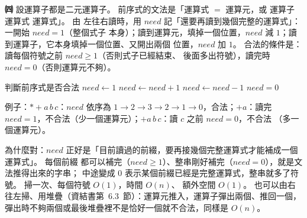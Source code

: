 \begin{pastsoln}
\textbf{㈣} 設運算子都是二元運算子。 前序式的文法是「運算式 $=$ 運算元，或 運算子 運算式 運算式」。 由
左往右讀時，用 $\mathit{need}$ 記「還要再讀到幾個完整的運算式」：一開始 $\mathit{need} = 1$（整個式子
本身）；讀到運算元，填掉一個位置，$\mathit{need}$ 減 $1$；讀到運算子，它本身填掉一個位置、又開出兩個
位置，$\mathit{need}$ 加 $1$。 合法的條件是：讀每個符號之前 $\mathit{need} \ge 1$（否則式子已經結束、
後面多出符號），讀完時 $\mathit{need} = 0$（否則運算元不夠）。
\begin{pseudo}[unbreakable]{判斷前序式是否合法}
 
    \State $\mathit{need} \gets 1$
            \State \Return \FALSE {}
        \EndIf
            \State $\mathit{need} \gets \mathit{need} + 1$
        \Else
            \State $\mathit{need} \gets \mathit{need} - 1$
        \EndIf
    \EndFor
    \State \Return $\mathit{need} = 0$
\EndFunction
\end{pseudo}
例子：$* + a\, b\, c$：$\mathit{need}$ 依序為 $1 \to 2 \to 3 \to 2 \to 1 \to 0$，合法；$+ a$：讀完
$\mathit{need} = 1$，不合法（少一個運算元）；$+ a\, b\, c$：讀 $c$ 之前 $\mathit{need} = 0$，不合法
（多一個運算元）。

為什麼對：$\mathit{need}$ 正好是「目前讀過的前綴，要再接幾個完整運算式才能補成一個運算式」。 每個前綴
都可以補完（$\mathit{need} \ge 1$）、整串剛好補完（$\mathit{need} = 0$），就是文法推得出來的字串；
中途變成 $0$ 表示某個前綴已經是完整運算式，整串就多了符號。 掃一次、每個符號 $O(1)$，時間 $O(n)$、
額外空間 $O(1)$。 也可以由右往左掃、用堆疊（資結書第~6.3~節）：運算元推入，運算子彈出兩個、推回一個，
彈出時不夠兩個或最後堆疊裡不是恰好一個就不合法，同樣是 $O(n)$。
\end{pastsoln}
